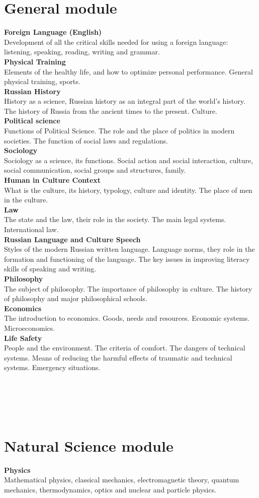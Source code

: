 \documentclass[a4paper, 12pt]{article}
\newcommand{\group}[1] {\section{#1}}
\newcommand{\discipline}[1] {\textbf{#1} \\ }
\newcommand{\desc}[1] { #1 \\ }
\begin{document}
\group{General module}

\discipline{Foreign Language (English)}
\desc{Development of all the critical skills needed for using a foreign language: listening, speaking, reading, writing and grammar.}

\discipline{Physical Training}
\desc{Elements of the healthy life, and how to optimize personal performance. General physical training, sports.}

\discipline{Russian History}
\desc{History as a science, Russian history as an integral part of the world's history. The history of Russia from the ancient times to the present. Culture.}

\discipline{Political science}
\desc{Functions of Political Science. The role and the place of politics in modern societies. The function of social laws and regulations.}

\discipline{Sociology}
\desc{Sociology as a science, its functions. Social action and social interaction, culture, social communication, social groups and structures, family.}

\discipline{Human in Culture Context}
\desc{What is the culture, its history, typology, culture and identity. The place of men in the culture.}

\discipline{Law}
\desc{The state and the law, their role in the society. The main legal systems. International law.}

\discipline{Russian Language and Culture Speech}
\desc{Styles of the modern Russian written language. Language norms, they role in the formation and functioning of the language. The key issues in improving literacy skills of speaking and writing.}

\discipline{Philosophy}
\desc{The subject of philosophy. The importance of philosophy in culture. The history of philosophy and major philosophical schools.}

\discipline{Economics}
\desc{The introduction to economics. Goods, needs and resources. Economic systems. Microeconomics.}

\discipline{Life Safety}
\desc{People and the environment. The criteria of comfort. The dangers of technical systems. Means of reducing the harmful effects of traumatic and technical systems. Emergency situations.}

\

\

\

\group{Natural Science module}

\discipline{Physics}
\desc{Mathematical physics, classical mechanics, electromagnetic theory, quantum mechanics, thermodynamics, optics and nuclear and particle physics.}
\end{document}
